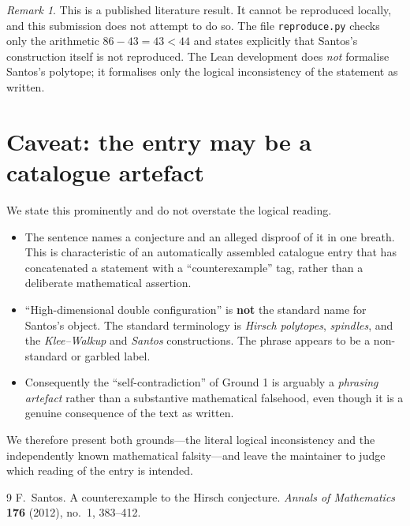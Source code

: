 \documentclass[11pt]{article}
\theoremstyle{remark}
\newtheorem{remark}[theorem]{Remark}
\begin{document}
\begin{remark}
This is a published literature result. It cannot be reproduced locally, and
this submission does not attempt to do so. The file \texttt{reproduce.py}
checks only the arithmetic $86 - 43 = 43 < 44$ and states explicitly that
Santos's construction itself is not reproduced. The Lean development does
\emph{not} formalise Santos's polytope; it formalises only the logical
inconsistency of the statement as written.
\end{remark}

\section{Caveat: the entry may be a catalogue artefact}

We state this prominently and do not overstate the logical reading.

\begin{itemize}
  \item The sentence names a conjecture and an alleged disproof of it in one
    breath. This is characteristic of an automatically assembled catalogue
    entry that has concatenated a statement with a ``counterexample'' tag,
    rather than a deliberate mathematical assertion.
  \item ``High-dimensional double configuration'' is \textbf{not} the standard
    name for Santos's object. The standard terminology is \emph{Hirsch
    polytopes}, \emph{spindles}, and the \emph{Klee--Walkup} and
    \emph{Santos} constructions. The phrase appears to be a non-standard or
    garbled label.
  \item Consequently the ``self-contradiction'' of Ground 1 is arguably a
    \emph{phrasing artefact} rather than a substantive mathematical
    falsehood, even though it is a genuine consequence of the text as
    written.
\end{itemize}

We therefore present both grounds---the literal logical inconsistency and the
independently known mathematical falsity---and leave the maintainer to judge
which reading of the entry is intended.

\begin{thebibliography}{9}
F.~Santos.
\newblock A counterexample to the Hirsch conjecture.
\newblock \emph{Annals of Mathematics} \textbf{176} (2012), no.~1, 383--412.
\end{thebibliography}
\end{document}
